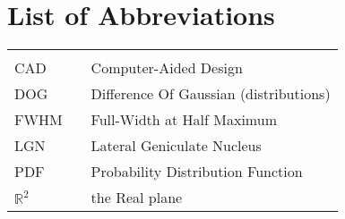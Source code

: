 \hypertarget{list-of-abbreviations}{%
\chapter*{List of Abbreviations}\label{list-of-abbreviations}}

\begin{center}
    \begin{tabular}{lll}
        \hspace*{2em}    & \hspace*{1in} & \hspace*{4.5in}                        \\
        CAD              & \dotfill      & Computer-Aided Design                  \\
        DOG              & \dotfill      & Difference Of Gaussian (distributions) \\
        FWHM             & \dotfill      & Full-Width at Half Maximum             \\
        LGN              & \dotfill      & Lateral Geniculate Nucleus             \\
        PDF              & \dotfill      & Probability Distribution Function      \\
        $\mathbb{R}^{2}$ & \dotfill      & the Real plane                         \\
    \end{tabular}
\end{center}
